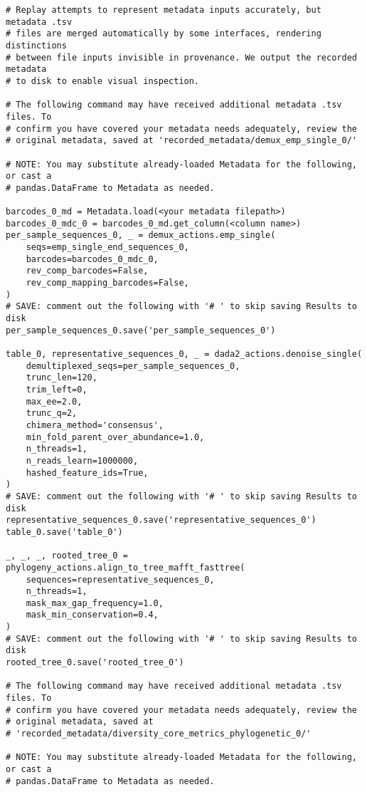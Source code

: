 \begin{footnotesize}
\begin{verbatim}
# Replay attempts to represent metadata inputs accurately, but metadata .tsv
# files are merged automatically by some interfaces, rendering distinctions
# between file inputs invisible in provenance. We output the recorded metadata
# to disk to enable visual inspection.

# The following command may have received additional metadata .tsv files. To
# confirm you have covered your metadata needs adequately, review the
# original metadata, saved at 'recorded_metadata/demux_emp_single_0/'

# NOTE: You may substitute already-loaded Metadata for the following, or cast a
# pandas.DataFrame to Metadata as needed.

barcodes_0_md = Metadata.load(<your metadata filepath>)
barcodes_0_mdc_0 = barcodes_0_md.get_column(<column name>)
per_sample_sequences_0, _ = demux_actions.emp_single(
    seqs=emp_single_end_sequences_0,
    barcodes=barcodes_0_mdc_0,
    rev_comp_barcodes=False,
    rev_comp_mapping_barcodes=False,
)
# SAVE: comment out the following with '# ' to skip saving Results to disk
per_sample_sequences_0.save('per_sample_sequences_0')

table_0, representative_sequences_0, _ = dada2_actions.denoise_single(
    demultiplexed_seqs=per_sample_sequences_0,
    trunc_len=120,
    trim_left=0,
    max_ee=2.0,
    trunc_q=2,
    chimera_method='consensus',
    min_fold_parent_over_abundance=1.0,
    n_threads=1,
    n_reads_learn=1000000,
    hashed_feature_ids=True,
)
# SAVE: comment out the following with '# ' to skip saving Results to disk
representative_sequences_0.save('representative_sequences_0')
table_0.save('table_0')

_, _, _, rooted_tree_0 = phylogeny_actions.align_to_tree_mafft_fasttree(
    sequences=representative_sequences_0,
    n_threads=1,
    mask_max_gap_frequency=1.0,
    mask_min_conservation=0.4,
)
# SAVE: comment out the following with '# ' to skip saving Results to disk
rooted_tree_0.save('rooted_tree_0')

# The following command may have received additional metadata .tsv files. To
# confirm you have covered your metadata needs adequately, review the
# original metadata, saved at
# 'recorded_metadata/diversity_core_metrics_phylogenetic_0/'

# NOTE: You may substitute already-loaded Metadata for the following, or cast a
# pandas.DataFrame to Metadata as needed.


\end{verbatim}
\end{footnotesize}
